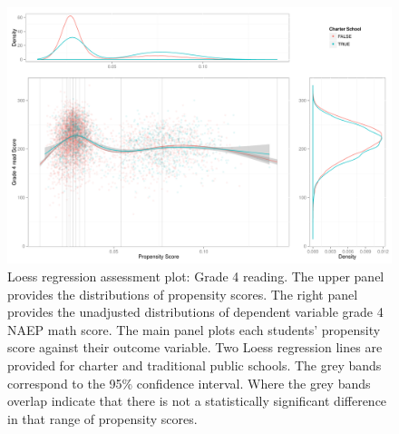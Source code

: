 \begin{figure}[h!]
\begin{center}
\includegraphics{../Figures2009/g4read-loess.pdf}
\caption[Loess regression assessment plot: Grade 4 reading]{Loess regression assessment plot: Grade 4 reading. The upper panel provides the distributions of propensity scores. The right panel provides the unadjusted distributions of dependent variable grade 4 NAEP math score. The main panel plots each students' propensity score against their outcome variable. Two Loess regression lines are provided for charter and traditional public schools. The grey bands correspond to the 95\% confidence interval. Where the grey bands overlap indicate that there is not a statistically significant difference in that range of propensity scores.}
\label{fig:g4read:loess}
\end{center}
\end{figure}

